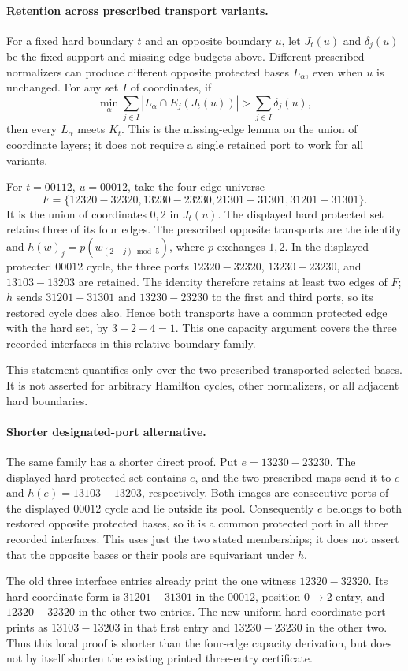 \paragraph{Retention across prescribed transport variants.}
For a fixed hard boundary $t$ and an opposite boundary $u$, let
$J_t(u)$ and $\delta_j(u)$ be the fixed support and missing-edge
budgets above. Different prescribed normalizers can produce different
opposite protected bases $L_\alpha$, even when $u$ is unchanged.
For any set $I$ of coordinates, if
\[
\min_\alpha\sum_{j\in I}|L_\alpha\cap E_j(J_t(u))|
 >\sum_{j\in I}\delta_j(u),
\]
then every $L_\alpha$ meets $K_t$. This is the missing-edge lemma
on the union of coordinate layers; it does not require a single
retained port to work for all variants.

For $t=00112$, $u=00012$, take the four-edge universe
\[
F=\{12320\!-32320,13230\!-23230,
21301\!-31301,31201\!-31301\}.
\]
It is the union of coordinates $0,2$ in $J_t(u)$.
The displayed hard protected set retains three of its four edges.
The prescribed opposite transports are the identity and
$h(w)_j=p(w_{(2-j)\bmod5})$, where $p$ exchanges $1,2$.
In the displayed protected $00012$ cycle, the three ports
$12320\!-32320$, $13230\!-23230$, and $13103\!-13203$
are retained. The identity therefore retains at least two edges
of $F$; $h$ sends $31201\!-31301$ and $13230\!-23230$
to the first and third ports, so its restored cycle does also.
Hence both transports have a common protected edge with the hard
set, by $3+2-4=1$. This one capacity argument covers the three
recorded interfaces in this relative-boundary family.

This statement quantifies only over the two prescribed transported
selected bases. It is not asserted for arbitrary Hamilton cycles,
other normalizers, or all adjacent hard boundaries.

\paragraph{Shorter designated-port alternative.}
The same family has a shorter direct proof. Put
$e=13230\!-23230$. The displayed hard protected set contains $e$,
and the two prescribed maps send it to $e$ and
$h(e)=13103\!-13203$, respectively. Both images are consecutive
ports of the displayed $00012$ cycle and lie outside its pool.
Consequently $e$ belongs to both restored opposite protected bases,
so it is a common protected port in all three recorded interfaces.
This uses just the two stated memberships; it does not assert that
the opposite bases or their pools are equivariant under $h$.

The old three interface entries already print the one witness
$12320\!-32320$. Its hard-coordinate form is
$31201\!-31301$ in the $00012$, position $0\to2$ entry,
and $12320\!-32320$ in the other two entries. The new uniform
hard-coordinate port prints as $13103\!-13203$ in that first entry
and $13230\!-23230$ in the other two. Thus this local proof is
shorter than the four-edge capacity derivation, but does not by itself
shorten the existing printed three-entry certificate.
